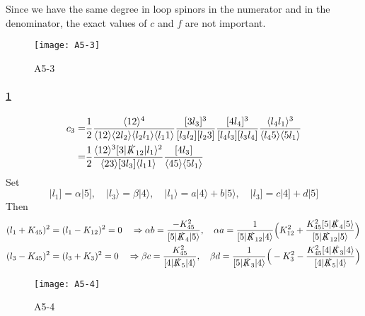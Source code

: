 Since we have the same degree in loop spinors in the numerator and in the denominator, the exact values of $c$ and $f$ are not important.
%
\begin{figure}
  \centering
    \texttt{[image: A5-3]}
    \caption{A5-3}
  \label{A5-3}
\end{figure}
\paragraph{\ref{A5-3}}
\begin{equation*}
\begin{split}
c_3 = &
\frac{1}{2}
\frac{\langle 12 \rangle^4}{\langle 12 \rangle\langle 2l_2 \rangle\langle l_2 l_1 \rangle\langle l_1 1 \rangle}
\frac{[3l_3]^3}{[l_3 l_2][l_2 3]}
\frac{[4 l_4]^3}{[l_4 l_3][l_3 l_4]}
\frac{\langle l_4 l_1 \rangle^3}{\langle l_4 5\rangle\langle 5 l_1 \rangle}
\\
= &
\frac{1}{2}\frac{\langle 12 \rangle^3 [3|\slashed{K}_{12}|l_1\rangle^2}{\langle 23 \rangle [ 3 l_3]\langle l_1 1\rangle}\frac{[4l_3]}{\langle 45\rangle\langle 5l_1\rangle}
\end{split}
\end{equation*}
Set
\begin{equation*}
|l_1] = \alpha|5] ,\quad
|l_3\rangle = \beta|4\rangle, \quad
|l_1\rangle = a |4\rangle + b|5\rangle ,\quad
|l_3] = c|4] + d|5] 
\end{equation*}
Then
\begin{equation*}
\begin{split}
& (l_1 + K_{45})^2 = (l_1 - K_{12})^2 = 0 \quad\Rightarrow
\alpha b = \frac{-K_{45}^2}{[5|\slashed{K}_4|5\rangle} ,\quad
\alpha a = \frac{1}{[5|\slashed{K}_{12}|4\rangle}\Big(K_{12}^2 + \frac{K_{45}^2[5|\slashed{K}_4|5\rangle}{[5|\slashed{K}_{12}|5\rangle}\Big)
\\
& (l_3 -K_{45})^2 = (l_3 + K_3)^2 = 0 \quad\Rightarrow
\beta c =\frac{K_{45}^2}{[4|\slashed{K}_5|4\rangle} ,\quad
\beta d = \frac{1}{[5|\slashed{K}_3|4\rangle}\Big( -K_3^2 - \frac{K_{45}^2[4|\slashed{K}_3|4\rangle}{[4|\slashed{K}_5|4\rangle}\Big)
\end{split}
\end{equation*}
%
%
\begin{figure}
  \centering
    \texttt{[image: A5-4]}
    \caption{A5-4}
  \label{A5-4}
\end{figure}
